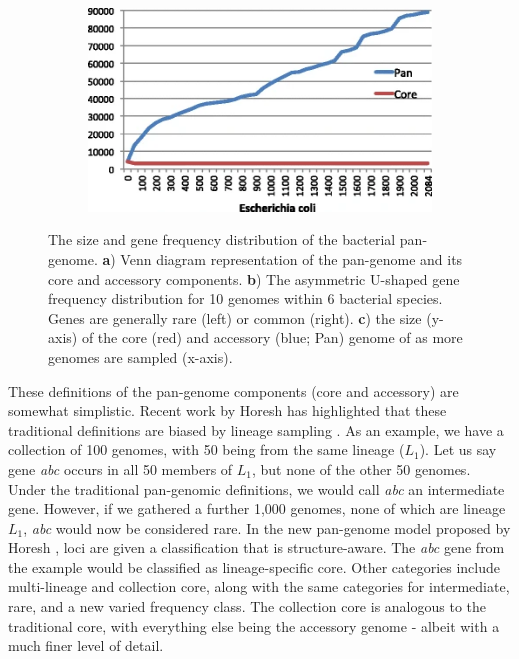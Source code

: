 \begin{figure}
\begin{subfigure}[b]{0.475\textwidth}
         \caption{}
         \label{fig:pangenome-freq}
     \end{subfigure}
     \begin{subfigure}[b]{0.8\textwidth}
        \includegraphics[width=1\linewidth]{Chapter0/Figs/pangenome-size.png}
        \centering
        \caption{}
        \label{fig:pangenome-size}
     \end{subfigure}
    \caption{The size and gene frequency distribution of the bacterial pan-genome. \textbf{a}) Venn diagram representation of the pan-genome and its core and accessory components. \textbf{b}) The asymmetric U-shaped gene frequency distribution for 10 genomes within 6 bacterial species. Genes are generally rare (left) or common (right). \textbf{c}) the size (y-axis) of the core (red) and accessory (blue; Pan) genome of \ecoli{} as more genomes are sampled (x-axis).}
        \label{fig:pangenome}
\end{figure}

\noindent
These definitions of the pan-genome components (core and accessory) are somewhat simplistic. Recent work by Horesh \etal{} has highlighted that these traditional definitions are biased by lineage sampling \cite{Horesh2021}. As an example, we have a collection of 100 genomes, with 50 being from the same lineage ($L_1$). Let us say gene \textit{abc} occurs in all 50 members of $L_1$, but none of the other 50 genomes. Under the traditional pan-genomic definitions, we would call \textit{abc} an intermediate gene. However, if we gathered a further 1,000 genomes, none of which are lineage $L_1$, \textit{abc} would now be considered rare. In the new pan-genome model proposed by Horesh \etal{}, loci are given a classification that is structure-aware. The \textit{abc} gene from the example would be classified as lineage-specific core. Other categories include multi-lineage and collection core, along with the same categories for intermediate, rare, and a new varied frequency class. The collection core is analogous to the traditional core, with everything else being the accessory genome - albeit with a much finer level of detail.

